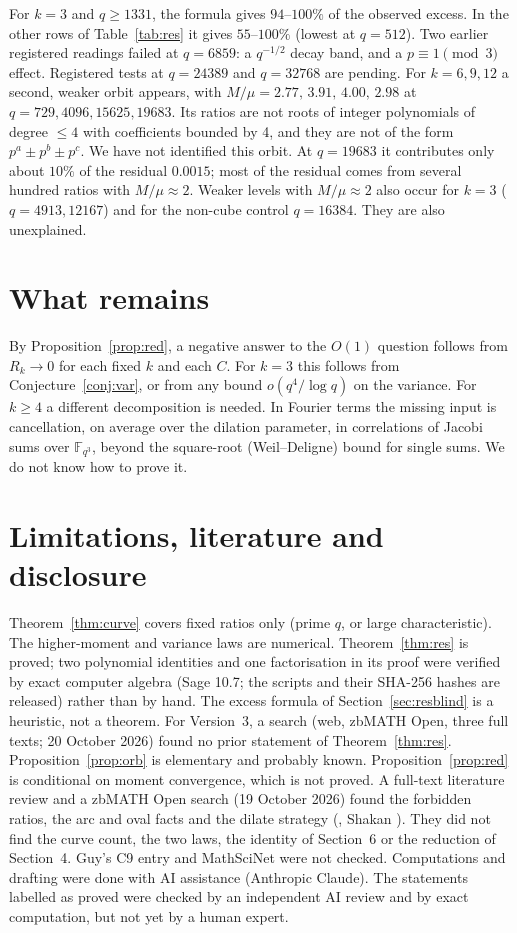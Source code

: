 \documentclass[11pt]{article}
\begin{document}
For $k=3$ and $q\ge1331$, the formula gives $94$--$100\%$ of the observed excess. In the other rows of Table~\ref{tab:res} it gives $55$--$100\%$ (lowest at $q=512$).
Two earlier registered readings failed at $q=6859$: a $q^{-1/2}$ decay band, and a $p\equiv1\pmod3$ effect. Registered tests at $q=24389$ and $q=32768$ are pending.
For $k=6,9,12$ a second, weaker orbit appears, with $M/\mu=2.77,\,3.91,\,4.00,\,2.98$ at $q=729,4096,15625,19683$. Its ratios are not roots of integer
polynomials of degree $\le4$ with coefficients bounded by 4, and they are not of the form $p^a\pm p^b\pm p^c$. We have not identified this orbit.
At $q=19683$ it contributes only about $10\%$ of the residual $0.0015$; most of the residual comes from several hundred ratios with $M/\mu\approx2$.
Weaker levels with $M/\mu\approx2$ also occur for $k=3$ ($q=4913,12167$) and for the non-cube control $q=16384$. They are also unexplained.

\section{What remains}\label{sec:rem}
By Proposition~\ref{prop:red}, a negative answer to the $O(1)$ question follows from $R_k\to0$ for each fixed $k$ and each $C$. For $k=3$ this follows
from Conjecture~\ref{conj:var}, or from any bound $o(q^4/\log q)$ on the variance. For $k\ge4$ a different decomposition is needed. In
Fourier terms the missing input is cancellation, on average over the dilation parameter, in correlations of Jacobi sums over
$\mathbb F_{q^3}$, beyond the square-root (Weil--Deligne) bound for single sums. We do not know how to prove it.

\section{Limitations, literature and disclosure}\label{sec:lim}
Theorem~\ref{thm:curve} covers fixed ratios only (prime $q$, or large characteristic). The higher-moment and variance laws are
numerical. Theorem~\ref{thm:res} is proved; two polynomial identities and one factorisation in its proof were verified by exact computer algebra (Sage 10.7; the scripts and their SHA-256 hashes are released) rather than by hand. The excess formula of Section~\ref{sec:resblind} is a heuristic, not a theorem. For Version~3, a search (web, zbMATH Open, three full texts; 20 October 2026) found no prior statement of Theorem~\ref{thm:res}. Proposition~\ref{prop:orb} is elementary and probably known. Proposition~\ref{prop:red} is conditional on moment convergence, which is not proved. A full-text literature review and a
zbMATH Open search (19 October 2026) found the forbidden ratios, the arc and oval facts \cite{JV,Pi} and the dilate strategy
(\cite{Go}, Shakan \cite{Sh}). They did not find the curve count, the two laws, the identity of Section~6 or the reduction of
Section~4. Guy's C9 entry and MathSciNet were not checked. Computations and drafting were done with AI assistance (Anthropic Claude).
The statements labelled as proved were checked by an independent AI review and by exact computation, but not yet by a human expert.
\end{document}
